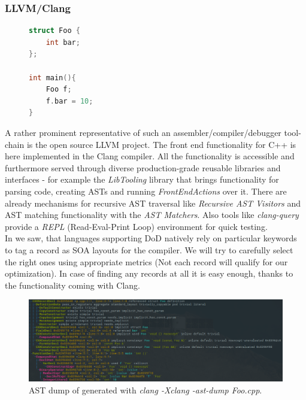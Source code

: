 \subsubsection{LLVM/Clang}
\begin{figure}
\vspace{-20pt}
\begin{lstlisting}[language=C++,name={Example code in a Foo.cpp file},label={foo_code}]
struct Foo {
	int bar;
};

int main(){
	Foo f;
	f.bar = 10;
}
\end{lstlisting}
\end{figure}
A rather prominent representative of such an assembler/compiler/debugger tool-chain is the open source LLVM project. The front end functionality for C++ is here implemented in the Clang compiler. All the functionality is accessible and furthermore served through diverse production-grade reusable libraries and interfaces  - for example the \textit{LibTooling} library that brings functionality for parsing code, creating ASTs and running \textit{FrontEndActions} over it. There are already mechanisms for recursive AST traversal like \textit{Recursive AST Visitors} and AST matching functionality with the \textit{AST Matchers}. Also tools like \textit{clang-query} provide a \textit{REPL} (Read-Eval-Print Loop) environment for quick testing.\\
In  we saw, that languages supporting DoD natively rely on particular keywords to tag a record as SOA layouts for the compiler. We will try to carefully select the right ones using appropriate metrics (Not each record will qualify for our optimization). In case of finding any records at all it is easy enough, thanks to the functionality coming with Clang.
\begin{figure}[!htbp]
	\centering
	\includegraphics[width=\linewidth, height=0.5\textwidth]{PICs/foo_code_ast_dump}
	\caption{AST dump of  generated with \textit{clang -Xclang -ast-dump Foo.cpp}.}\label{foo_code_ast_dump}
\end{figure}
